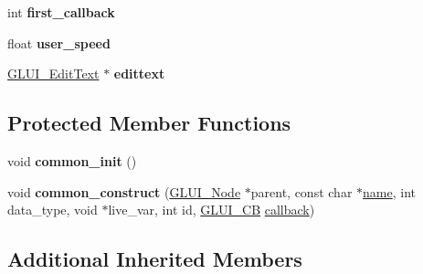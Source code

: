 \begin{DoxyCompactItemize}
\item 
\hypertarget{classGLUI__Spinner_ae16da3f5d44b51089a85ce900b5369c8}{int {\bfseries first\-\_\-callback}}\label{classGLUI__Spinner_ae16da3f5d44b51089a85ce900b5369c8}

\item 
\hypertarget{classGLUI__Spinner_a436397a68c2a7a5a891e6476a70d2807}{float {\bfseries user\-\_\-speed}}\label{classGLUI__Spinner_a436397a68c2a7a5a891e6476a70d2807}

\item 
\hypertarget{classGLUI__Spinner_a708461cddff3603041cf95a1935a64d0}{\hyperlink{classGLUI__EditText}{G\-L\-U\-I\-\_\-\-Edit\-Text} $\ast$ {\bfseries edittext}}\label{classGLUI__Spinner_a708461cddff3603041cf95a1935a64d0}

\end{DoxyCompactItemize}
\subsection*{Protected Member Functions}
\begin{DoxyCompactItemize}
\item 
\hypertarget{classGLUI__Spinner_a796a4c94a59a4b5db0672cc3bbf2562e}{void {\bfseries common\-\_\-init} ()}\label{classGLUI__Spinner_a796a4c94a59a4b5db0672cc3bbf2562e}

\item 
\hypertarget{classGLUI__Spinner_af99b5ae2b431195f494d8bdb45f3a79e}{void {\bfseries common\-\_\-construct} (\hyperlink{classGLUI__Node}{G\-L\-U\-I\-\_\-\-Node} $\ast$parent, const char $\ast$\hyperlink{classGLUI__Control_aa95b97d50df45335fc33f0af03958eb3}{name}, int data\-\_\-type, void $\ast$live\-\_\-var, int id, \hyperlink{classGLUI__CB}{G\-L\-U\-I\-\_\-\-C\-B} \hyperlink{classGLUI__Control_a96060fe0cc6d537e736dd6eef78e24ab}{callback})}\label{classGLUI__Spinner_af99b5ae2b431195f494d8bdb45f3a79e}

\end{DoxyCompactItemize}
\subsection*{Additional Inherited Members}


